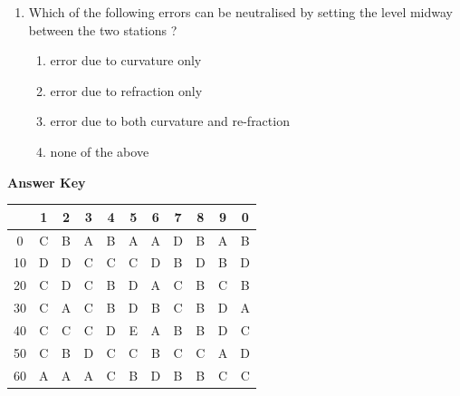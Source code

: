 \documentclass[11pt,a4paper]{article}
\begin{document}
\begin{enumerate}
{}
\\
\item{Which of the following errors can be neutralised by setting the level midway between the two stations ?}
\begin{enumerate}[label=\Alph*.]
\item{error due to curvature only}
\item{error due to refraction only}
\item{error due to both curvature and re-fraction}
\item{none of the above}
\end{enumerate}
\end{enumerate}
\textbf{Answer Key}
\begin{tabular}{ | c | c c c c c c c c c c | }
\hline
 & 1 & 2 & 3 & 4 & 5 & 6 & 7 & 8 & 9 & 0 \\
\hline
0 & C & B & A & B & A & A & D & B & A & B \\
10 & D & D & C & C & C & D & B & D & B & D \\
20 & C & D & C & B & D & A & C & B & C & B \\
30 & C & A & C & B & D & B & C & B & D & A \\
40 & C & C & C & D & E & A & B & B & D & C \\
50 & C & B & D & C & C & B & C & C & A & D \\
60 & A & A & A & C & B & D & B & B & C & C \\
\hline
\end{tabular}
\clearpage
\end{document}
